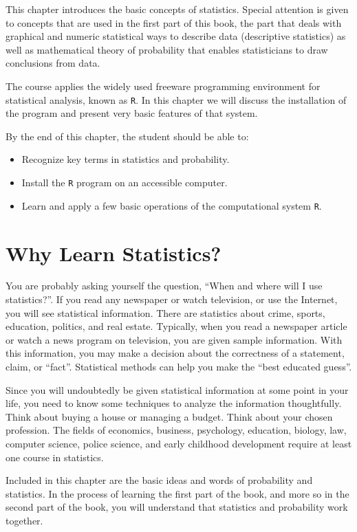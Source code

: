 \documentclass[]{krantz}
\providecommand{\tightlist}{%
  \setlength{\itemsep}{0pt}\setlength{\parskip}{0pt}}
\theoremstyle{definition}
\theoremstyle{definition}
\theoremstyle{definition}
\theoremstyle{remark}
\begin{document}
This chapter introduces the basic concepts of statistics. Special
attention is given to concepts that are used in the first part of this
book, the part that deals with graphical and numeric statistical ways to
describe data (descriptive statistics) as well as mathematical theory of
probability that enables statisticians to draw conclusions from data.

The course applies the widely used freeware programming environment for
statistical analysis, known as \texttt{R}. In this chapter we will
discuss the installation of the program and present very basic features
of that system.

By the end of this chapter, the student should be able to:

\begin{itemize}
\tightlist
\item
  Recognize key terms in statistics and probability.
\item
  Install the \texttt{R} program on an accessible computer.
\item
  Learn and apply a few basic operations of the computational system
  \texttt{R}.
\end{itemize}

\section{Why Learn Statistics?}\label{why-learn-statistics}

You are probably asking yourself the question, ``When and where will I
use statistics?''. If you read any newspaper or watch television, or use
the Internet, you will see statistical information. There are statistics
about crime, sports, education, politics, and real estate. Typically,
when you read a newspaper article or watch a news program on television,
you are given sample information. With this information, you may make a
decision about the correctness of a statement, claim, or ``fact''.
Statistical methods can help you make the ``best educated guess''.

Since you will undoubtedly be given statistical information at some
point in your life, you need to know some techniques to analyze the
information thoughtfully. Think about buying a house or managing a
budget. Think about your chosen profession. The fields of economics,
business, psychology, education, biology, law, computer science, police
science, and early childhood development require at least one course in
statistics.

Included in this chapter are the basic ideas and words of probability
and statistics. In the process of learning the first part of the book,
and more so in the second part of the book, you will understand that
statistics and probability work together.
\end{document}
